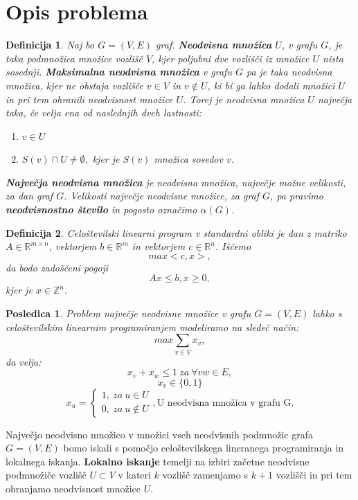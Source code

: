 \documentclass[a4paper, 12pt]{article}
\newtheorem{definicija}{Definicija}
\newtheorem{posledica}{Posledica}
\begin{document}
\section{Opis problema}
\begin{definicija}
    Naj bo $G = (V,E)$ graf. \textbf{Neodvisna množica} $U$, v grafu $G$, je taka podmnožica množice vozlišč $V$, kjer poljubni dve vozlišči iz množice $U$ nista sosednji.
    \textbf{Maksimalna neodvisna množica} v grafu $G$ pa je taka neodvisna množica, kjer ne obstaja vozlišče $v \in V$ in $v \notin U$, ki bi ga lahko dodali množici $U$ in pri tem ohranili neodvisnost množice $U$. Torej
    je neodvisna množica $U$ največja taka, če velja ena od naslednjih dveh lastnosti:
    \begin{enumerate}
        \item $v \in U$
        \item $S(v) \cap U \neq \emptyset,$ kjer je $S(v)$ množica sosedov $v$.
    \end{enumerate}
    \textbf{Največja neodvisna množica} je neodvisna množica, največje možne velikosti, za dan graf $G$. Velikosti največje neodvisne množice, za graf $G$, pa pravimo \textbf{neodvisnostno število} in 
    pogosto označimo $\alpha(G)$.
\end{definicija}

\begin{definicija}
    Celoštevilski linearni program v standardni obliki je dan z matriko $A \in \mathbb{R}^{m \times n}$, vektorjem $b \in \mathbb{R}^{m}$ in vektorjem $c \in \mathbb{R}^{n}$. Iščemo
    $$max<c,x>,$$
    da bodo zadoščeni pogoji
    $$ Ax \leq b, x \geq 0,$$
    kjer je $x \in \mathbb{Z}^{n}.$

\end{definicija}

\begin{posledica}
Problem največje neodvisne množice v grafu $G=(V,E)$ lahko s celoštevilskim linearnim programiranjem modeliramo na sledeč način:
$$max \sum_{v \in V} x_{v},$$
da velja:
$$ x_{v} + x_{w} \leq 1 \ za \ \forall vw \in E,$$
$$ x_{v} \in \{0, 1 \}$$
$$ x_{u} = 
    \begin{cases}
    1, \ za \ u \in U \\
    0, \ za \ u \notin U
    \end{cases}, \text{U neodvisna množica v grafu G.}
$$
\end{posledica}

Največjo neodvisno množico v množici vseh neodvisnih podmnožic grafa $G = (V,E)$ bomo iskali s pomočjo celoštevilskega lineranega programiranja in lokalnega iskanja. \textbf{Lokalno iskanje} temelji na
izbiri začetne neodvisne podmnožiče vozlišč $U \subset V$ v kateri $k$ vozlišč zamenjamo s $k + 1$ vozlišči in pri tem ohranjamo neodvisnost množice $U$.
\end{document}
